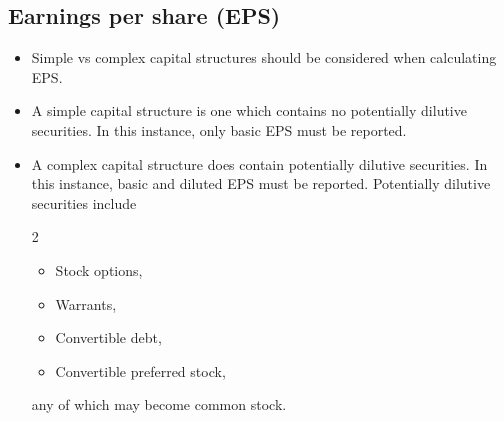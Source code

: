 \documentclass[../notes_compiled.tex]{subfiles}
\begin{document}
\subsection{Earnings per share (EPS)}
\begin{itemize}
\item Simple vs complex capital structures should be considered when calculating EPS.
\item A simple capital structure is one which contains no potentially dilutive securities. In this instance, only basic EPS must be reported.
\item A complex capital structure does contain potentially dilutive securities. In this instance, basic and diluted EPS must be reported. Potentially dilutive securities include
\begin{multicols}{2}
\begin{itemize}
\item Stock options,
\item Warrants,
\item Convertible debt,
\item Convertible preferred stock,
\end{itemize}
\end{multicols}
any of which may become common stock.
\end{itemize}
\end{document}
